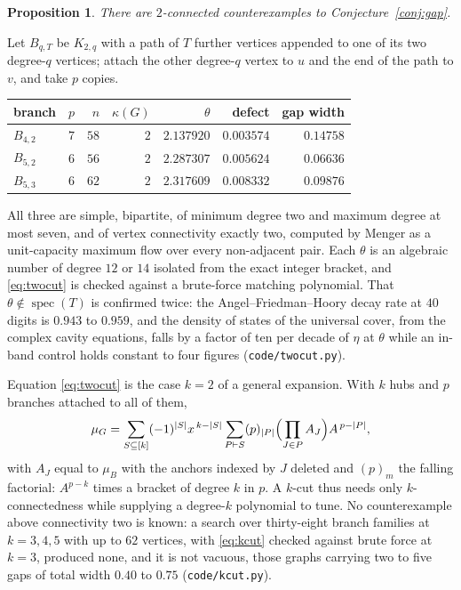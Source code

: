 \documentclass[11pt]{article}
\newtheorem{proposition}[theorem]{Proposition}
\theoremstyle{remark}
\begin{document}
\begin{proposition}\label{prop:twoconn}
There are $2$-connected counterexamples to Conjecture~\ref{conj:gap}.
\end{proposition}

Let $B_{q,T}$ be $K_{2,q}$ with a path of $T$ further vertices appended to one of its two
degree-$q$ vertices; attach the other degree-$q$ vertex to $u$ and the end of the path to $v$,
and take $p$ copies.

\begin{center}
\begin{tabular}{lrrrrrr}
branch & $p$ & $n$ & $\kappa(G)$ & $\theta$ & defect & gap width\\\hline
$B_{4,2}$ & $7$ & $58$ & $2$ & $2.137920$ & $0.003574$ & $0.14758$\\
$B_{5,2}$ & $6$ & $56$ & $2$ & $2.287307$ & $0.005624$ & $0.06636$\\
$B_{5,3}$ & $6$ & $62$ & $2$ & $2.317609$ & $0.008332$ & $0.09876$\\
\end{tabular}
\end{center}

All three are simple, bipartite, of minimum degree two and maximum degree at most seven, and of
vertex connectivity exactly two, computed by Menger as a unit-capacity maximum flow over every
non-adjacent pair. Each $\theta$ is an algebraic number of degree $12$ or $14$ isolated from the
exact integer bracket, and \eqref{eq:twocut} is checked against a brute-force matching
polynomial. That $\theta\notin\operatorname{spec}(T)$ is confirmed twice: the
Angel--Friedman--Hoory decay rate at $40$ digits is $0.943$ to $0.959$, and the density of states
of the universal cover, from the complex cavity equations, falls by a factor of ten per decade of
$\eta$ at $\theta$ while an in-band control holds constant to four figures
(\texttt{code/twocut.py}).

Equation \eqref{eq:twocut} is the case $k=2$ of a general expansion. With $k$ hubs and $p$
branches attached to all of them,
\begin{equation}\label{eq:kcut}
   \mu_G=\sum_{S\subseteq[k]}(-1)^{|S|}x^{\,k-|S|}
        \sum_{P\vdash S}(p)_{|P|}\Bigl(\prod_{J\in P}A_J\Bigr)A^{\,p-|P|},
\end{equation}
with $A_J$ equal to $\mu_B$ with the anchors indexed by $J$ deleted and $(p)_m$ the falling
factorial: $A^{p-k}$ times a bracket of degree $k$ in $p$. A $k$-cut thus needs only
$k$-connectedness while supplying a degree-$k$ polynomial to tune. No counterexample above
connectivity two is known: a search over thirty-eight branch families at $k=3,4,5$ with up to
$62$ vertices, with \eqref{eq:kcut} checked against brute force at $k=3$, produced none, and it
is not vacuous, those graphs carrying two to five gaps of total width $0.40$ to $0.75$
(\texttt{code/kcut.py}).
\end{document}
